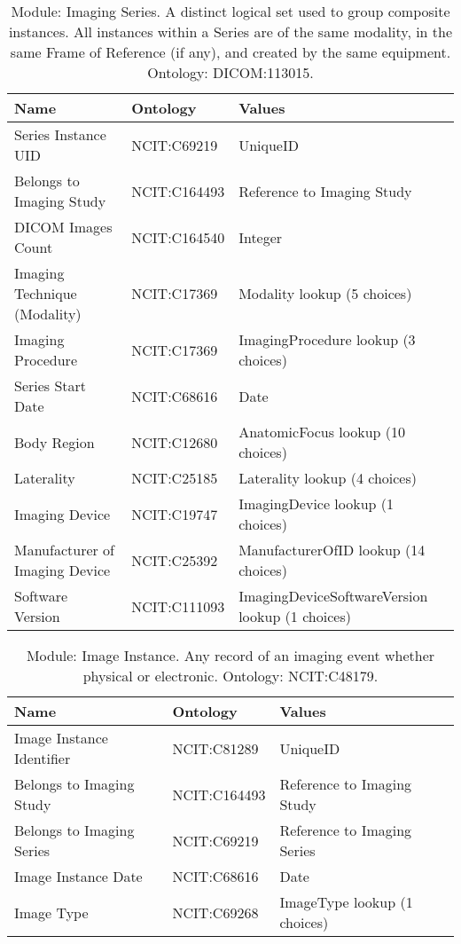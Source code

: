 \documentclass{article}
\begin{document}
\begin{table}[htb]
\begin{tabular}{lll}
Name & Ontology & Values \\
\hline
Series Instance UID & NCIT:C69219 & UniqueID \\
Belongs to Imaging Study & NCIT:C164493 & Reference to Imaging Study \\
DICOM Images Count & NCIT:C164540 & Integer \\
Imaging Technique (Modality) & NCIT:C17369 & Modality lookup (5 choices) \\
Imaging Procedure & NCIT:C17369 & ImagingProcedure lookup (3 choices) \\
Series Start Date & NCIT:C68616 & Date \\
Body Region & NCIT:C12680 & AnatomicFocus lookup (10 choices) \\
Laterality & NCIT:C25185 & Laterality lookup (4 choices) \\
Imaging Device & NCIT:C19747 & ImagingDevice lookup (1 choices) \\
Manufacturer of Imaging Device & NCIT:C25392 & ManufacturerOfID lookup (14 choices) \\
Software Version & NCIT:C111093 & ImagingDeviceSoftwareVersion lookup (1 choices) \\
\hline
\end{tabular}
\caption[Module: Imaging Series]{\label{table:table16} Module: Imaging Series. A distinct logical set used to group composite instances. All instances within a Series are of the same modality, in the same Frame of Reference (if any), and created by the same equipment. Ontology: DICOM:113015. }
\end{table}

\begin{table}[htb]
\begin{tabular}{lll}
Name & Ontology & Values \\
\hline
Image Instance Identifier & NCIT:C81289 & UniqueID \\
Belongs to Imaging Study & NCIT:C164493 & Reference to Imaging Study \\
Belongs to Imaging Series & NCIT:C69219 & Reference to Imaging Series \\
Image Instance Date & NCIT:C68616 & Date \\
Image Type & NCIT:C69268 & ImageType lookup (1 choices) \\
\hline
\end{tabular}
\caption[Module: Image Instance]{\label{table:table17} Module: Image Instance. Any record of an imaging event whether physical or electronic. Ontology: NCIT:C48179. }
\end{table}
\end{document}
